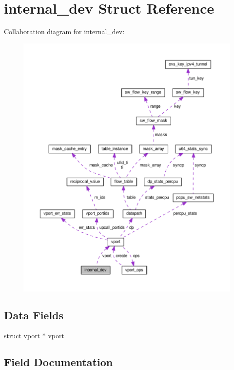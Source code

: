 \hypertarget{structinternal__dev}{}\section{internal\+\_\+dev Struct Reference}
\label{structinternal__dev}


Collaboration diagram for internal\+\_\+dev\+:
\nopagebreak
\begin{figure}[H]
\begin{center}
\leavevmode
\includegraphics[width=350pt]{structinternal__dev__coll__graph}
\end{center}
\end{figure}
\subsection*{Data Fields}
\begin{DoxyCompactItemize}
\item 
struct \hyperlink{structvport}{vport} $\ast$ \hyperlink{structinternal__dev_ad571bd9420f8b95ac7d1febc36c6ef45}{vport}
\end{DoxyCompactItemize}


\subsection{Field Documentation}
\hypertarget{structinternal__dev_ad571bd9420f8b95ac7d1febc36c6ef45}{}

